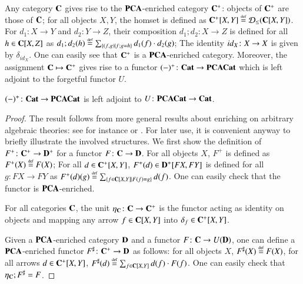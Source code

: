 Any category $\mathbf{C}$ gives rise to the $\mathbf{PCA}$-enriched category $\mathbf{C}^+$: objects of  $\mathbf{C}^+$ are those of $\mathbf{C}$; for all objects $X,Y$, the homset is defined as $\mathbf{C}^+[X,Y] \stackrel{\text{\tiny def}}{=} \mathcal{D}_{\leq}(\mathbf{C}[X,Y])$. For $d_1\colon X \to Y$ and $d_2\colon Y \to Z$, their composition $d_1;d_2 \colon X\to Z$ is defined for all $h\in \mathbf{C}[X,Z]$ as $d_1;d_2(h) \stackrel{\text{\tiny def}}{=} \sum_{\{(f,g)\mid f;g=h\}}d_1(f) \cdot d_2(g)$; The identity ${id}_{X}\colon X \to X$ is given by $\delta_{id_X}$. One can easily see that $\mathbf{C}^+$ is a $\mathbf{PCA}$-enriched category. Moreover, the assignment $\mathbf{C} \mapsto \mathbf{C}^+$ gives rise to a functor $(-)^+\colon \mathbf{Cat} \to \mathbf{PCACat}$ which is left adjoint to the forgetful functor $U$. %

\begin{theorem}\label{thm:freeenriched}
 $(-)^+\colon \mathbf{Cat} \to \mathbf{PCACat}$ is left adjoint to $U\colon \mathbf{PCACat} \to \mathbf{Cat}$.
\end{theorem}
\begin{proof}%
The result follows from more general results about enriching on arbitrary algebraic theories: see for instance \cite[Prop. 6.4.7]{borceux2} or \cite[Cor. 1]{villoria2024enriching}. For later use, it is convenient anyway to briefly illustrate the involved structures. We first show the definition of $F^+\colon \mathbf{C}^+ \to \mathbf{D}^+$ for a functor $F\colon \mathbf{C} \to \mathbf{D}$. For all objects $X$, $F^+$ is defined as $F^+(X)\stackrel{\text{\tiny def}}{=} F(X)$; For all $d\in \mathbf{C}^+[X,Y]$, $F^+(d)\in \mathbf{D}^+[FX, FY]$ is defined for all $g\colon FX \to FY$ as $F^+(d)(g)\stackrel{\text{\tiny def}}{=} \sum_{\{f\in \mathbf{C}[X,Y]| F(f)=g\}}d(f)$.  One can easily check that the functor is $\mathbf{PCA}$-enriched.


For all categories $\mathbf{C}$, the unit $\eta_{\mathbf{C}}\colon \mathbf{C} \to \mathbf{C}^+$ is the functor acting as identity on objects and mapping any arrow $f\in \mathbf{C}[X,Y]$ into $\delta_f \in \mathbf{C^+}[X,Y]$.

Given a $\mathbf{PCA}$-enriched category $\mathbf{D}$ and a functor $F\colon \mathbf{C} \to U(\mathbf{D})$, one can define a $\mathbf{PCA}$-enriched functor $F^\sharp \colon \mathbf{C}^+ \to \mathbf{D}$ as follows: for all objects $X$, $F^\sharp(X)\stackrel{\text{\tiny def}}{=} F(X)$, for all arrows $d\in \mathbf{C}^+[X,Y]$, $F^\sharp(d)\stackrel{\text{\tiny def}}{=} \sum_{f\in \mathbf{C}[X,Y]}d(f)\cdot {F(f)}$. One can easily check that $\eta_{\mathbf{C}} ; F^\sharp=F$.   

\end{proof}

